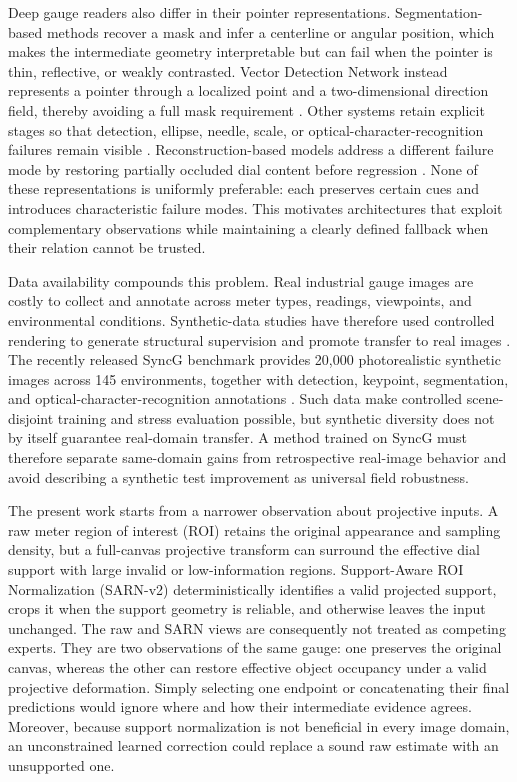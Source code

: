 \documentclass[electronics,article,submit,oneauthor]{Definitions/mdpi}
\begin{document}
Deep gauge readers also differ in their pointer representations. Segmentation-based methods recover a mask and infer a centerline or angular position, which makes the intermediate geometry interpretable but can fail when the pointer is thin, reflective, or weakly contrasted. Vector Detection Network instead represents a pointer through a localized point and a two-dimensional direction field, thereby avoiding a full mask requirement \cite{dong2021vdn}. Other systems retain explicit stages so that detection, ellipse, needle, scale, or optical-character-recognition failures remain visible \cite{reitsma2024underpressure}. Reconstruction-based models address a different failure mode by restoring partially occluded dial content before regression \cite{ninama2026grnet}. None of these representations is uniformly preferable: each preserves certain cues and introduces characteristic failure modes. This motivates architectures that exploit complementary observations while maintaining a clearly defined fallback when their relation cannot be trusted.

Data availability compounds this problem. Real industrial gauge images are costly to collect and annotate across meter types, readings, viewpoints, and environmental conditions. Synthetic-data studies have therefore used controlled rendering to generate structural supervision and promote transfer to real images \cite{leonalcazar2023synthetic}. The recently released SyncG benchmark provides 20,000 photorealistic synthetic images across 145 environments, together with detection, keypoint, segmentation, and optical-character-recognition annotations \cite{deng2026syncg}. Such data make controlled scene-disjoint training and stress evaluation possible, but synthetic diversity does not by itself guarantee real-domain transfer. A method trained on SyncG must therefore separate same-domain gains from retrospective real-image behavior and avoid describing a synthetic test improvement as universal field robustness.

The present work starts from a narrower observation about projective inputs. A raw meter region of interest (ROI) retains the original appearance and sampling density, but a full-canvas projective transform can surround the effective dial support with large invalid or low-information regions. Support-Aware ROI Normalization (SARN-v2) deterministically identifies a valid projected support, crops it when the support geometry is reliable, and otherwise leaves the input unchanged. The raw and SARN views are consequently not treated as competing experts. They are two observations of the same gauge: one preserves the original canvas, whereas the other can restore effective object occupancy under a valid projective deformation. Simply selecting one endpoint or concatenating their final predictions would ignore where and how their intermediate evidence agrees. Moreover, because support normalization is not beneficial in every image domain, an unconstrained learned correction could replace a sound raw estimate with an unsupported one.
\end{document}
